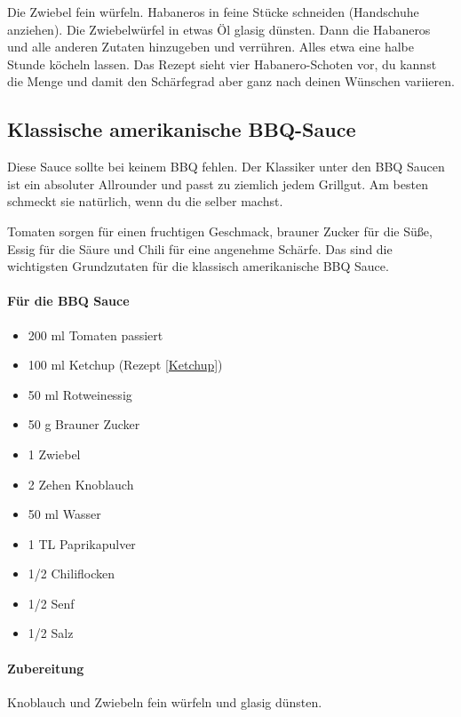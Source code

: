 Die Zwiebel fein würfeln. Habaneros in feine Stücke schneiden (Handschuhe 
anziehen).
Die Zwiebelwürfel in etwas Öl glasig dünsten. Dann die Habaneros und alle 
anderen Zutaten 
hinzugeben und verrühren.
Alles etwa eine halbe Stunde köcheln lassen.
Das Rezept sieht vier Habanero-Schoten vor, du kannst die Menge und damit 
den Schärfegrad aber 
ganz nach deinen Wünschen variieren.

\subsection{Klassische amerikanische BBQ-Sauce}
Diese Sauce sollte bei keinem BBQ fehlen. Der Klassiker unter den BBQ Saucen 
ist ein absoluter Allrounder und passt zu ziemlich jedem Grillgut.
Am besten schmeckt sie natürlich, wenn du die selber machst.

Tomaten sorgen für einen fruchtigen Geschmack, brauner Zucker für die Süße, 
Essig für die Säure und Chili für eine angenehme Schärfe. Das
sind die wichtigsten Grundzutaten für die klassisch amerikanische BBQ Sauce.
\newline

\paragraph{Für die BBQ Sauce}

\begin{itemize}[noitemsep]
	\item 200 ml Tomaten passiert
	\item 100 ml Ketchup (Rezept \vref{Ketchup})
	\item 50 ml Rotweinessig
	\item 50 g Brauner Zucker
	\item 1 Zwiebel
	\item 2 Zehen Knoblauch
	\item 50 ml Wasser
	\item 1 TL Paprikapulver
	\item 1/2 Chiliflocken
	\item 1/2 Senf
	\item 1/2 Salz
\end{itemize}

\paragraph{Zubereitung}

Knoblauch und Zwiebeln fein würfeln und glasig dünsten.

